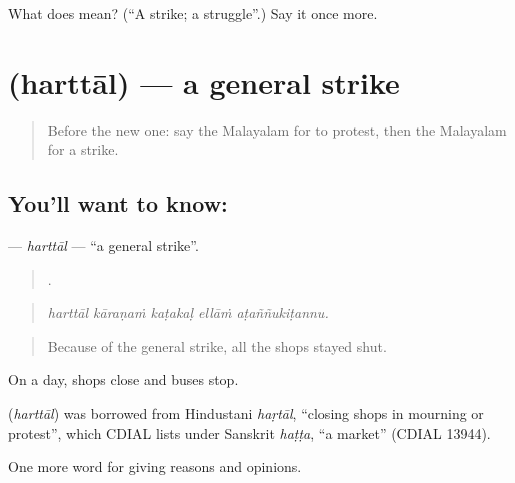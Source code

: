 \begin{tcolorbox}[breakable,colback=teal!4,colframe=teal!35!black,title={Before you move on}]
What does  mean? (\textquotedblleft{}A strike; a struggle\textquotedblright{}.) Say it once more.
\end{tcolorbox}
\section[\texorpdfstring{\ml{ഹർത്താൽ} (harttāl)}{ഹർത്താൽ (harttāl)}]{ (harttāl) — a general strike}

\label{lesson:ML-C425-harttal}



\begin{quote}
Before the new one: say the Malayalam for to protest, then the Malayalam for a strike.
\end{quote}

\subsection*{You'll want to know: }
\textbf{} — \emph{harttāl} — \textquotedblleft{}a general strike\textquotedblright{}.

\begin{quote}
    .
\end{quote}

\begin{quote}
\emph{harttāl kāraṇaṁ kaṭakaḷ ellāṁ aṭaññukiṭannu.}
\end{quote}

\begin{quote}
Because of the general strike, all the shops stayed shut.
\end{quote}

On a  day, shops close and buses stop.

\begin{cousinweb}
\textbf{} (\emph{harttāl}) was borrowed from Hindustani \emph{haṛtāl}, \textquotedblleft{}closing shops in mourning or protest\textquotedblright{}, which CDIAL lists under Sanskrit \emph{haṭṭa}, \textquotedblleft{}a market\textquotedblright{} (CDIAL 13944).
\end{cousinweb}

\begin{grammarlens}[title={What you've built}]
One more word for giving reasons and opinions.
\end{grammarlens}

